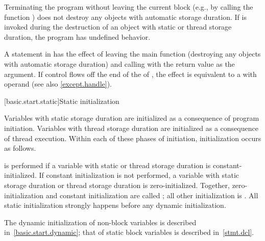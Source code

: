 \pnum
{}%
%
%
Terminating the program
without leaving the current block (e.g., by calling the function
) does not destroy any
objects with automatic storage duration. If
 is invoked during the destruction of
an object with static or thread storage duration, the program has undefined
behavior.

\pnum
{}%
%
A  statement in  has the effect of leaving the main
function (destroying any objects with automatic storage duration) and
calling  with the return value as the argument.
If control flows off the end of
the  of ,
the effect is equivalent to a  with operand 
(see also \ref{except.handle}).

[basic.start.static]{Static initialization}

\pnum
{}%
%
Variables with static storage duration
are initialized as a consequence of program initiation. Variables with
thread storage duration are initialized as a consequence of thread execution.
Within each of these phases of initiation, initialization occurs as follows.

\pnum
{}%
 is performed
if a variable with static or thread storage duration
is constant-initialized.
%
If constant initialization is not performed, a variable with static
storage duration or thread storage
duration is zero-initialized.
Together, zero-initialization and constant initialization are called
;
all other initialization is .
All static initialization strongly happens before
any dynamic initialization.
\begin{note}
The dynamic initialization of non-block variables is described
in~\ref{basic.start.dynamic}; that of static block variables is described
in~\ref{stmt.dcl}.
\end{note}

